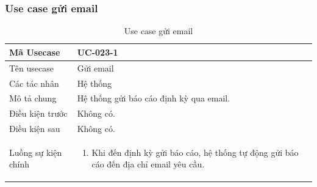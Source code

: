 \documentclass[12pt,a4paper]{article}
\begin{document}
    \subsubsection*{Use case gửi email}
    \begin{table}[H]
        \centering
        \begin{tabular}{|p{3.5cm}|p{11.5cm}|c|}
            \hline
            Mã Usecase      & UC-023-1                                \\
            \hline
            Tên usecase     & Gửi email                               \\
            \hline
            Các tác nhân    & Hệ thống                                \\
            \hline
            Mô tả chung     & Hệ thống gửi báo cáo định kỳ qua email. \\
            \hline

            Điều kiện trước & Không có.                               \\
            \hline

            Điều kiện sau   & Không có.                               \\
            \hline

            Luồng sự kiện chính & \vspace{-.8cm}\begin{enumerate}
                                                    \item Khi đến định kỳ gửi báo cáo, hệ thống tự động gửi báo cáo đến địa chỉ email yêu cầu.
            \end{enumerate}
            \\
            \hline
        \end{tabular}
        \caption{Use case gửi email}

    \end{table}


\end{document}
